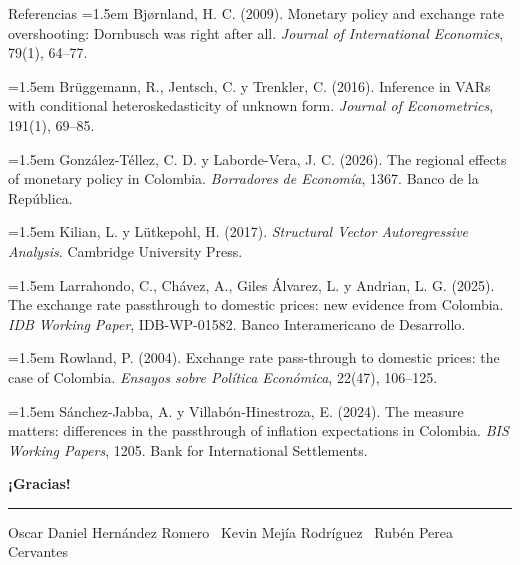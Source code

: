 \documentclass{beamer}
\begin{document}
\begin{frame}{Referencias}
  \scriptsize
  \setlength{\parskip}{0.45em}
  \hangindent=1.5em
  Bj{\o}rnland, H. C. (2009). Monetary policy and exchange rate overshooting: Dornbusch was right after all. \textit{Journal of International Economics}, 79(1), 64--77.\par
  \hangindent=1.5em
  Brüggemann, R., Jentsch, C. y Trenkler, C. (2016). Inference in VARs with conditional heteroskedasticity of unknown form. \textit{Journal of Econometrics}, 191(1), 69--85.\par
  \hangindent=1.5em
  González-Téllez, C. D. y Laborde-Vera, J. C. (2026). The regional effects of monetary policy in Colombia. \textit{Borradores de Economía}, 1367. Banco de la República.\par
  \hangindent=1.5em
  Kilian, L. y Lütkepohl, H. (2017). \textit{Structural Vector Autoregressive Analysis}. Cambridge University Press.\par
  \hangindent=1.5em
  Larrahondo, C., Chávez, A., Giles Álvarez, L. y Andrian, L. G. (2025). The exchange rate passthrough to domestic prices: new evidence from Colombia. \textit{IDB Working Paper}, IDB-WP-01582. Banco Interamericano de Desarrollo.\par
  \hangindent=1.5em
  Rowland, P. (2004). Exchange rate pass-through to domestic prices: the case of Colombia. \textit{Ensayos sobre Política Económica}, 22(47), 106--125.\par
  \hangindent=1.5em
  Sánchez-Jabba, A. y Villabón-Hinestroza, E. (2024). The measure matters: differences in the passthrough of inflation expectations in Colombia. \textit{BIS Working Papers}, 1205. Bank for International Settlements.\par
\end{frame}

\begin{frame}
  \vfill
  \begin{center}
    {\fontsize{30}{34}\selectfont\bfseries\color{azulraf}¡Gracias!\par}
    \vspace{0.35cm}
    {\color{azulraf}\rule{0.35\textwidth}{1.2pt}\par}
    \vspace{0.5cm}
    {\small Oscar Daniel Hernández Romero \textperiodcentered\ Kevin Mejía Rodríguez \textperiodcentered\ Rubén Perea Cervantes\par}
  \end{center}
  \vfill
\end{frame}
\end{document}
